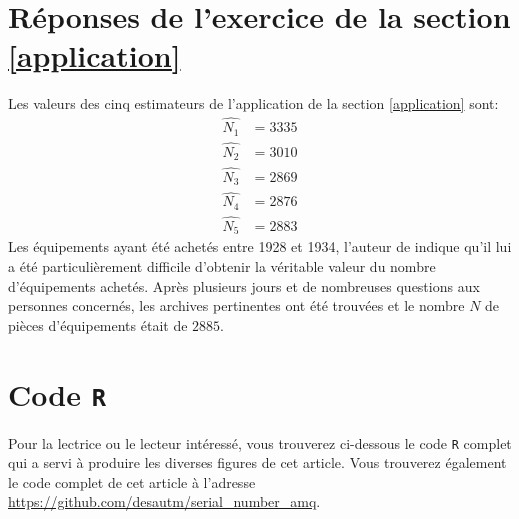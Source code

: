 \documentclass[10pt]{article}
\begin{document}
\hypertarget{reponses-de-lexercice-de-la-section}{%
\section{\texorpdfstring{Réponses de l'exercice de la section
\ref{application}
\label{rep-application}}{Réponses de l'exercice de la section  }}\label{reponses-de-lexercice-de-la-section}}

Les valeurs des cinq estimateurs de l'application de la section
\ref{application} sont: \begin{align*}
\widehat{N_1} &= 3335 \\
\widehat{N_2} &= 3010 \\
\widehat{N_3} &= 2869 \\
\widehat{N_4} &= 2876 \\
\widehat{N_5} &= 2883
\end{align*} Les équipements ayant été achetés entre 1928 et 1934,
l'auteur de \cite{Goodman1954} indique qu'il lui a été particulièrement
difficile d'obtenir la véritable valeur du nombre d'équipements achetés.
Après plusieurs jours et de nombreuses questions aux personnes
concernés, les archives pertinentes ont été trouvées et le nombre \(N\)
de pièces d'équipements était de \(2885\).

\hypertarget{code-r}{%
\section{\texorpdfstring{Code \texttt{R}
\label{code}}{Code R }}\label{code-r}}

Pour la lectrice ou le lecteur intéressé, vous trouverez ci-dessous le
code \texttt{R} complet qui a servi à produire les diverses figures de
cet article. Vous trouverez également le code complet de cet article à
l'adresse \url{https://github.com/desautm/serial_number_amq}.
\end{document}
